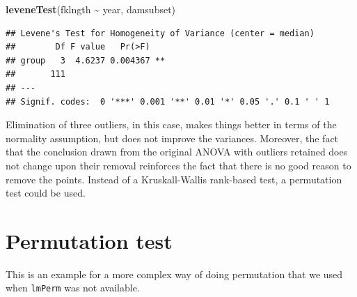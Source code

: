 \documentclass[
  12pt,
]{book}
\newenvironment{Shaded}{\begin{snugshade}}{\end{snugshade}}
\newcommand{\KeywordTok}[1]{\textcolor[rgb]{0.13,0.29,0.53}{\textbf{#1}}}
\newcommand{\NormalTok}[1]{#1}
\newcommand{\OperatorTok}[1]{\textcolor[rgb]{0.81,0.36,0.00}{\textbf{#1}}}
\newcommand{\StringTok}[1]{\textcolor[rgb]{0.31,0.60,0.02}{#1}}
\begin{document}
\begin{Shaded}
\begin{Highlighting}[]
\KeywordTok{leveneTest}\NormalTok{(fklngth }\OperatorTok{\textasciitilde{}}\StringTok{ }\NormalTok{year, damsubset)}
\end{Highlighting}
\end{Shaded}

\begin{verbatim}
## Levene's Test for Homogeneity of Variance (center = median)
##        Df F value   Pr(>F)   
## group   3  4.6237 0.004367 **
##       111                    
## ---
## Signif. codes:  0 '***' 0.001 '**' 0.01 '*' 0.05 '.' 0.1 ' ' 1
\end{verbatim}

Elimination of three outliers, in this case, makes things better in terms of the normality assumption, but does not improve the
variances. Moreover, the fact that the conclusion drawn from the original ANOVA with outliers retained does not change upon their removal reinforces the fact that there is no good reason to remove the points. Instead of a Kruskall-Wallis rank-based test, a permutation test could be used.

\hypertarget{permutation-test}{%
\section{Permutation test}\label{permutation-test}}

This is an example for a more complex way of doing permutation that we used when \texttt{lmPerm} was not available.
\end{document}
